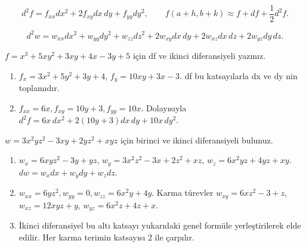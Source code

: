 {\small\[
d^2f=f_{xx}dx^2+2f_{xy}dx\,dy+f_{yy}dy^2,\qquad f(a+h,b+k)\approx f+df+\frac12d^2f.
\]}

{\small\[
d^2w=w_{xx}dx^2+w_{yy}dy^2+w_{zz}dz^2+2w_{xy}dx\,dy+2w_{xz}dx\,dz+2w_{yz}dy\,dz.
\]}
\begin{tcolorbox}[title={Örnek 5.13 | Tahtadaki polinom diferansiyeli},colframe=accent]\(f=x^3+5xy^2+3xy+4x-3y+5\) için df ve ikinci diferansiyeli yazınız.
\par{}\end{tcolorbox}
\begin{tcolorbox}[title={Adım adım çözüm},colback=green!3!white,colframe=green]\begin{enumerate}
\item \(f_x=3x^2+5y^2+3y+4\), \(f_y=10xy+3x-3\). df bu katsayılarla dx ve dy nin toplamıdır.
\item \(f_{xx}=6x,f_{xy}=10y+3,f_{yy}=10x\). Dolayısıyla \(d^2f=6x\,dx^2+2(10y+3)dx\,dy+10x\,dy^2\).
\end{enumerate}\end{tcolorbox}
\begin{tcolorbox}[title={Örnek 5.14 | Üç değişkenli polinomun diferansiyelleri},colframe=accent]\(w=3x^2yz^2-3xy+2yz^2+xyz\) için birinci ve ikinci diferansiyeli bulunuz.
\par{}\end{tcolorbox}
\begin{tcolorbox}[title={Adım adım çözüm},colback=green!3!white,colframe=green]\begin{enumerate}
\item \(w_x=6xyz^2-3y+yz\), \(w_y=3x^2z^2-3x+2z^2+xz\), \(w_z=6x^2yz+4yz+xy\). \(dw=w_xdx+w_ydy+w_zdz\).
\item \(w_{xx}=6yz^2,w_{yy}=0,w_{zz}=6x^2y+4y\). Karma türevler \(w_{xy}=6xz^2-3+z\), \(w_{xz}=12xyz+y\), \(w_{yz}=6x^2z+4z+x\).
\item İkinci diferansiyel bu altı katsayı yukarıdaki genel formüle yerleştirilerek elde edilir. Her karma terimin katsayısı 2 ile çarpılır.
\end{enumerate}\end{tcolorbox}
